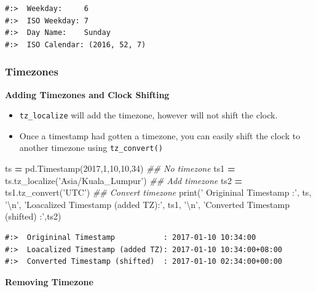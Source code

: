 \documentclass[
]{book}
\newenvironment{Shaded}{\begin{snugshade}}{\end{snugshade}}
\newcommand{\BuiltInTok}[1]{#1}
\newcommand{\CharTok}[1]{\textcolor[rgb]{0.5,0.5,0.5}{#1}}
\newcommand{\CommentTok}[1]{\textcolor[rgb]{0.37,0.37,0.37}{\textit{#1}}}
\newcommand{\DecValTok}[1]{\textcolor[rgb]{0.06,0.06,0.06}{#1}}
\newcommand{\NormalTok}[1]{#1}
\newcommand{\OperatorTok}[1]{\textcolor[rgb]{0.43,0.43,0.43}{\textbf{#1}}}
\newcommand{\StringTok}[1]{\textcolor[rgb]{0.5,0.5,0.5}{#1}}
\providecommand{\tightlist}{%
  \setlength{\itemsep}{0pt}\setlength{\parskip}{0pt}}
\begin{document}
\begin{verbatim}
#:>  Weekday:     6 
#:>  ISO Weekday: 7 
#:>  Day Name:    Sunday 
#:>  ISO Calendar: (2016, 52, 7)
\end{verbatim}

\hypertarget{timezones}{%
\subsubsection{Timezones}\label{timezones}}

\textbf{Adding Timezones and Clock Shifting}

\begin{itemize}
\tightlist
\item
  \texttt{tz\_localize} will add the timezone, however will not shift the clock.\\
\item
  Once a timestamp had gotten a timezone, you can easily shift the clock to another timezone using \texttt{tz\_convert()}
\end{itemize}

\begin{Shaded}
\begin{Highlighting}[]
\NormalTok{ts }\OperatorTok{=}\NormalTok{ pd.Timestamp(}\DecValTok{2017}\NormalTok{,}\DecValTok{1}\NormalTok{,}\DecValTok{10}\NormalTok{,}\DecValTok{10}\NormalTok{,}\DecValTok{34}\NormalTok{)        }\CommentTok{## No timezone}
\NormalTok{ts1 }\OperatorTok{=}\NormalTok{ ts.tz_localize(}\StringTok{'Asia/Kuala_Lumpur'}\NormalTok{)  }\CommentTok{## Add timezone}
\NormalTok{ts2 }\OperatorTok{=}\NormalTok{ ts1.tz_convert(}\StringTok{'UTC'}\NormalTok{)                 }\CommentTok{## Convert timezone}
\BuiltInTok{print}\NormalTok{(}\StringTok{' Origininal Timestamp           :'}\NormalTok{, ts,  }\StringTok{'}\CharTok{\textbackslash{}n}\StringTok{'}\NormalTok{,}
      \StringTok{'Loacalized Timestamp (added TZ):'}\NormalTok{, ts1, }\StringTok{'}\CharTok{\textbackslash{}n}\StringTok{'}\NormalTok{,}
      \StringTok{'Converted Timestamp (shifted)  :'}\NormalTok{,ts2)}
\end{Highlighting}
\end{Shaded}

\begin{verbatim}
#:>  Origininal Timestamp           : 2017-01-10 10:34:00 
#:>  Loacalized Timestamp (added TZ): 2017-01-10 10:34:00+08:00 
#:>  Converted Timestamp (shifted)  : 2017-01-10 02:34:00+00:00
\end{verbatim}

\textbf{Removing Timezone}
\end{document}
